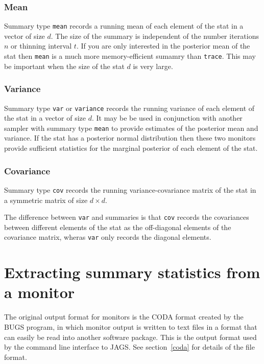 \documentclass[11pt, a4paper, titlepage]{report}
\newcommand{\JAGS}{\textsf{JAGS}}
\begin{document}
\subsubsection{Mean}

Summary type \texttt{mean} records a running mean of each element of
the stat in a vector of size $d$. The size of the summary is
independent of the number iterations $n$ or thinning interval $t$. If
you are only interested in the posterior mean of the stat then
\texttt{mean} is a much more memory-efficient sumamry than
\texttt{trace}. This may be important when the size of the stat $d$ is
very large.

\subsubsection{Variance}

Summary type \texttt{var} or \texttt{variance} records the running
variance of each element of the stat in a vector of size $d$. It may
be be used in conjunction with another sampler with summary type
\texttt{mean} to provide estimates of the posterior mean and
variance. If the stat has a posterior normal distribution then these
two monitors provide sufficient statistics for the marginal posterior
of each element of the stat.

\subsubsection{Covariance}

Summary type \texttt{cov} records the running variance-covariance matrix of
the stat in a symmetric matrix of size $d \times d$. 

The difference between \texttt{var} and  summaries is that
\texttt{cov} records the covariances between different elements of the
stat as the off-diagonal elements of the covariance matrix, wheras
\texttt{var} only records the diagonal elements. 

\section{Extracting summary statistics from a monitor}

The original output format for monitors is the CODA format created by
the BUGS program, in which monitor output is written to text files in
a format that can easily be read into another software package. This
is the output format used by the command line interface to \JAGS. See
section~\ref{coda} for details of the file format.
\end{document}
